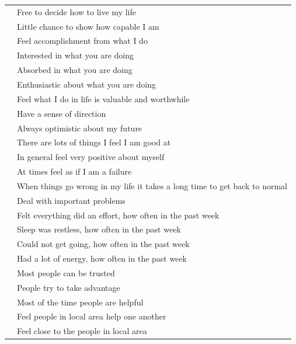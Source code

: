 \documentclass[titlepage,11pt,twoside]{article}
\begin{document}
{\begin{table}[h]
\begin{tabular}{ll}
\rowcolor{lightgray} & Free to decide how to live my life\\
\rowcolor{lightgray} & Little chance to show how capable I am\\
\rowcolor{lightgray} & Feel accomplishment from what I do\\
\rowcolor{lightgray} & Interested in what you are doing\\
\rowcolor{lightgray} & Absorbed in what you are doing\\
\rowcolor{lightgray} & Enthusiastic about what you are doing\\
\rowcolor{lightgray} & Feel what I do in life is valuable and worthwhile\\
\rowcolor{lightgray} & Have a sense of direction\\
\rowcolor{lightgray} & Always optimistic about my future\\
\rowcolor{lightgray} & There are lots of things I feel I am good at\\
\rowcolor{lightgray} & In general feel very positive about myself\\
\rowcolor{lightgray} & At times feel as if I am a failure\\
\rowcolor{lightgray} & When things go wrong in my life it takes a long time to get back to normal\\
\rowcolor{lightgray}\multirow{-14}{*}{Functioning} & Deal with important problems\\

\rowcolor{white} & Felt everything did an effort, how often in the past week\\
\rowcolor{white} & Sleep was restless, how often in the past week\\
\rowcolor{white} & Could not get going, how often in the past week\\
\rowcolor{white}\multirow{-4}{*}{Vitality} & Had a lot of energy, how often in the past week\\

\rowcolor{lightgray} &  Most people can be trusted\\
\rowcolor{lightgray} &  People try to take advantage\\
\rowcolor{lightgray} &  Most of the time people are helpful\\
\rowcolor{lightgray} &  Feel people in local area help one another\\
\rowcolor{lightgray}\multirow{-2}{*}{Community wellbeing}& Feel close to the people in local area\\


\end{tabular}
\end{table}}
\end{document}

